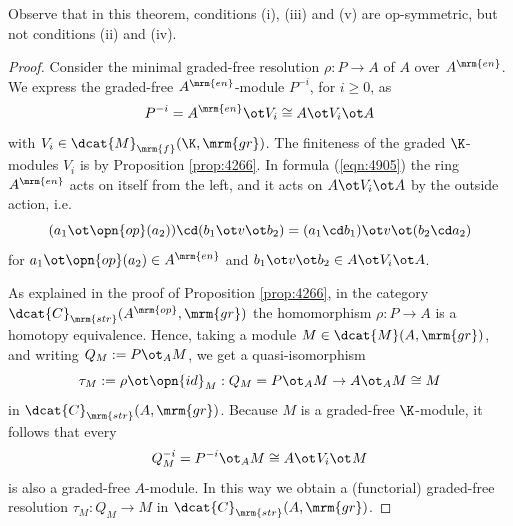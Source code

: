 Observe that in this theorem, conditions (i), (iii) and (v) are 
op-symmetric, but not conditions (ii) and (iv). 

\begin{proof}
Consider the minimal graded-free resolution
$\rho : P \to A$ of $A$ over $A^{\mrm{en}}$. 
We express the graded-free $A^{\mrm{en}}$-module $P^{-i}$, for $i \geq 0$,  as 
\begin{equation} \label{eqn:4905}
P^{-i} =  A^{\mrm{en}} \ot V_{i} \cong A \ot V_i \ot A 
\end{equation}
with $V_{i} \in \dcat{M}_{\mrm{f}}(\K, \mrm{gr})$. 
The finiteness of the graded $\K$-modules $V_{i}$ is by Proposition 
\ref{prop:4266}. In formula (\ref{eqn:4905}) the ring $A^{\mrm{en}}$ acts on 
itself from the left, and it acts on $A \ot V_i \ot A$ by the outside action,
i.e.\ 
\[ (a_1 \ot \opn{op}(a_2)) \cd (b_1 \ot v \ot b_2) = 
(a_1 \cd b_1) \ot v \ot (b_2 \cd a_2) \]
for $a_1 \ot \opn{op}(a_2) \in A^{\mrm{en}}$ and 
$b_1 \ot v \ot b_2 \in A \ot V_i \ot A$.

As explained in the proof of Proposition \ref{prop:4266}, in the category \lb
$\dcat{C}_{\mrm{str}}(A^{\mrm{op}}, \mrm{gr})$
the homomorphism $\rho : P \to A$ is a homotopy equivalence. Hence, taking 
a module $M \in \dcat{M}(A, \mrm{gr})$, and writing 
$Q_M := P \ot_{A} M$, we get a quasi-isomorphism 
\[ \tau_M := \rho \ot \opn{id}_M : Q_M = P \ot_{A} M \to A \ot_{A} M \cong M  \]
in $\dcat{C}_{\mrm{str}}(A, \mrm{gr})$. 
Because $M$ is a graded-free $\K$-module, it follows that every
\[ Q_M^{-i} = P^{-i} \ot_{A} M \cong A \ot_{} V_{i} \ot_{} M \]
is also a graded-free $A$-module.
In this way we obtain a (functorial) graded-free resolution
$\tau_M : Q_M \to  M$ 
in $\dcat{C}_{\mrm{str}}(A, \mrm{gr})$. 


\end{proof}
